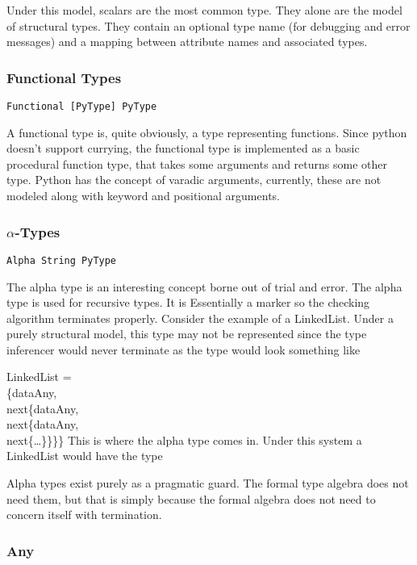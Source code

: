 \documentclass{scrartcl}
\begin{document}
\begin{multicols}{2}
Under this model, scalars are the most common type. They alone are
the model of structural types. They contain an optional type name
(for debugging and error messages) and a mapping between attribute
names and associated types.

\subsubsection*{Functional Types}

\texttt{Functional [PyType] PyType}

A functional type is, quite obviously, a type representing functions.
Since python doesn't support currying, the functional type is implemented
as a basic procedural function type, that takes some arguments and returns
some other type. Python has the concept of varadic arguments, currently,
these are not modeled along with keyword and positional arguments.

\subsubsection*{$\alpha$-Types}

\texttt{Alpha String PyType}

The alpha type is an interesting concept borne out of trial and error. The
alpha type is used for recursive types. It is Essentially a marker so
the checking algorithm terminates properly. Consider the example of
a LinkedList. Under a purely structural model, this type may not be represented
since the type inferencer would never terminate as the type
would look something like

\maths
{LinkedList =\\\{data\hastype Any,\\next\hastype \{data\hastype Any,\\next\hastype \{data\hastype Any,\\next\hastype \{\ldots\}\}\}\}}
This is where the alpha type comes in. Under this system
a LinkedList would have the type


Alpha types exist purely as a pragmatic guard. The formal type algebra does
not need them, but that is simply because the formal algebra does not need
to concern itself with termination.

\subsubsection*{Any}


\end{multicols}
\end{document}
